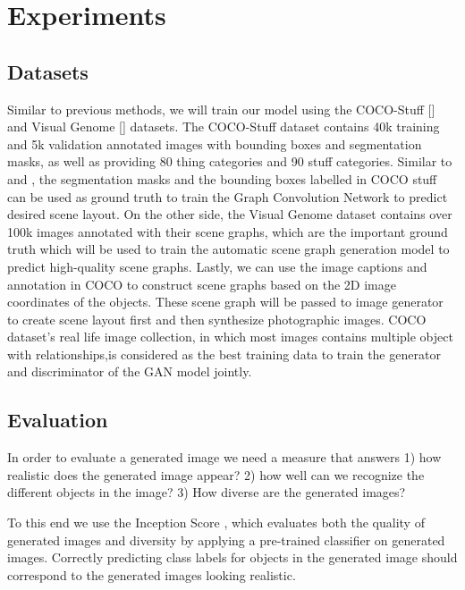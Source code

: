 \documentclass{article}
\begin{document}
\section{Experiments}

\subsection{Datasets}

Similar to previous methods, we will train our model using the COCO-Stuff [\cite{cocostuff}] and Visual Genome [\cite{visualgen}] datasets. The COCO-Stuff dataset contains 40k training and 5k validation annotated images with bounding boxes and segmentation masks, as well as providing 80 thing categories and 90 stuff categories. Similar to \cite{sg2im} and \cite{sg2imgcontext}, the segmentation masks and the bounding boxes labelled in COCO stuff can be used as ground truth to train the Graph Convolution Network to predict desired scene layout. On the other side, the Visual Genome dataset contains over 100k images annotated with their scene graphs, which are the important ground truth which will be used to train the automatic scene graph generation model to predict high-quality scene graphs. Lastly, we can use the image captions and annotation in COCO to construct scene graphs based on the 2D image coordinates of the objects. These scene graph will be passed to image generator to create scene layout first and then synthesize photographic images. COCO dataset's real life image collection, in which most images contains multiple object with relationships,is considered as the best training data to train the generator and discriminator of the GAN model jointly.  

\subsection{Evaluation}

In order to evaluate a generated image we need a measure that answers 1) how realistic does the generated image appear? 2) how well can we recognize the different objects in the image? 3) How diverse are the generated images?

To this end we use the Inception Score \cite{inception}, which evaluates both the quality of generated images and diversity by applying a pre-trained classifier on generated images. Correctly predicting class labels for objects in the generated image should correspond to the generated images looking realistic.
\end{document}
